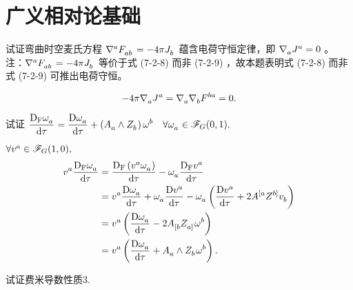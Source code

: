 
\chapter{广义相对论基础}
\begin{xiti}
	\item 试证弯曲时空麦氏方程 $\tensor{\nabla}{^a} \tensor{F}{_a_b} = - 4\pi \tensor{J}{_b}$ 蕴含电荷守恒定律，即 $\Nabla{a} \tensor{J}{^a} = 0$ 。注：$\tensor{\nabla}{^a} \tensor{F}{_a_b} = - 4\pi \tensor{J}{_b}$ 等价于式 (7-2-8) 而非 (7-2-9) ，故本题表明式 (7-2-8) 而非式 (7-2-9) 可推出电荷守恒。

	\begin{zm}
		\begin{equation*}
		-4 \pi \Nabla{a} \tensor{J}{^a} = \Nabla{a} \Nabla{b} \tensor{F}{^b^a} = 0.
		\end{equation*}
	\end{zm}

    \item 试证 $\displaystyle \Fd{\tensor{\omega}{_a}} = \Dd{\tensor{\omega}{_a}} + \left(\tensor{A}{_a} \wedge \tensor{Z}{_b}\right) \tensor{\omega}{^b} \quad \forall \tensor{\omega}{_a} \in \F_{G}(0,1).$

    \begin{zm}
    	$\forall \tensor{v}{^a} \in \F_{G}(1,0),$
    	\begin{align*}
    	    \tensor{v}{^a} \Fd{\tensor{\omega}{_a}} &= \Fd{\left(\tensor{v}{^a}\tensor{\omega}{_a}\right)} - \tensor{\omega}{_a} \Fd{\tensor{v}{^a}}\\
    	    &= \tensor{v}{^a} \Dd{\tensor{\omega}{_a}} + \tensor{\omega}{_a} \Dd{\tensor{v}{^a}} - \tensor{\omega}{_a} \left( \Dd{\tensor{v}{^a}} + 2 \tensor{A}{^{[a}} \tensor{Z}{^{b]}} \tensor{v}{_b} \right)\\
    	    &= \tensor{v}{^a} \left( \Dd{\tensor{\omega}{_a}} - 2 \tensor{A}{_{[b}} \tensor{Z}{_{a]}} \tensor{\omega}{^b} \right)\\
    	    &= \tensor{v}{^a} \left( \Dd{\tensor{\omega}{_a}} + \tensor{A}{_{a}} \wedge \tensor{Z}{_{b}} \tensor{\omega}{^b} \right).
    	\end{align*}
    \end{zm}

    \item 试证费米导数性质3.\label{prob-7.3}


\end{xiti}
